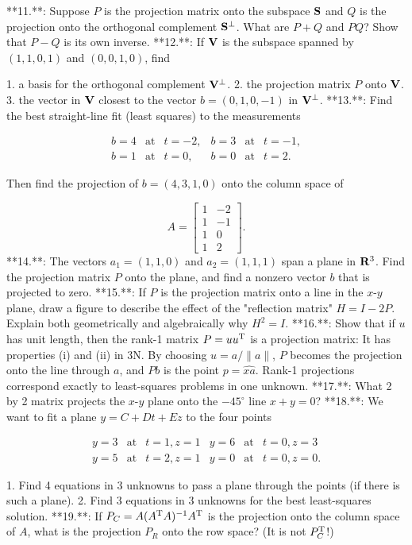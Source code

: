 

**11.**: Suppose \(P\) is the projection matrix onto the subspace \({\bf S}\) and \(Q\) is the projection onto the orthogonal complement \({\bf S}^{\perp}\). What are \(P+Q\) and \(PQ\)? Show that \(P-Q\) is its own inverse.
**12.**: If \({\bf V}\) is the subspace spanned by \((1,1,0,1)\) and \((0,0,1,0)\), find

1. a basis for the orthogonal complement \({\bf V}^{\perp}\).
2. the projection matrix \(P\) onto \({\bf V}\).
3. the vector in \({\bf V}\) closest to the vector \(b=(0,1,0,-1)\) in \({\bf V}^{\perp}\).
**13.**: Find the best straight-line fit (least squares) to the measurements

\[\begin{array}{llll}b=4&\mbox{at}&t=-2,&b=3&\mbox{at}&t=-1,\\ b=1&\mbox{at}&t=0,&b=0&\mbox{at}&t=2.\end{array}\]

Then find the projection of \(b=(4,3,1,0)\) onto the column space of

\[A=\begin{bmatrix}1&-2\\ 1&-1\\ 1&0\\ 1&2\end{bmatrix}.\]
**14.**: The vectors \(a_{1}=(1,1,0)\) and \(a_{2}=(1,1,1)\) span a plane in \({\bf R}^{3}\). Find the projection matrix \(P\) onto the plane, and find a nonzero vector \(b\) that is projected to zero.
**15.**: If \(P\) is the projection matrix onto a line in the \(x\)-\(y\) plane, draw a figure to describe the effect of the "reflection matrix" \(H=I-2P\). Explain both geometrically and algebraically why \(H^{2}=I\).
**16.**: Show that if \(u\) has unit length, then the rank-1 matrix \(P=uu^{\rm T}\) is a projection matrix: It has properties (i) and (ii) in 3N. By choosing \(u=a/\|a\|\), \(P\) becomes the projection onto the line through \(a\), and \(Pb\) is the point \(p=\widehat{xa}\). Rank-1 projections correspond exactly to least-squares problems in one unknown.
**17.**: What 2 by 2 matrix projects the \(x\)-\(y\) plane onto the \(-45^{\circ}\) line \(x+y=0\)?
**18.**: We want to fit a plane \(y=C+Dt+Ez\) to the four points

\[\begin{array}{llll}y=3&\mbox{at}&t=1,z=1&y=6&\mbox{at}&t=0,z=3\\ y=5&\mbox{at}&t=2,z=1&y=0&\mbox{at}&t=0,z=0.\end{array}\]

1. Find 4 equations in 3 unknowns to pass a plane through the points (if there is such a plane).
2. Find 3 equations in 3 unknowns for the best least-squares solution.
**19.**: If \(P_{C}=A(A^{\rm T}A)^{-1}A^{\rm T}\) is the projection onto the column space of \(A\), what is the projection \(P_{R}\) onto the row space? (It is not \(P_{C}^{\rm T}\)!)